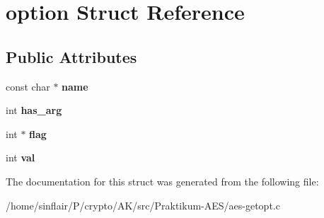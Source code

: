 \hypertarget{structoption}{}\section{option Struct Reference}
\label{structoption}
\subsection*{Public Attributes}
\begin{DoxyCompactItemize}
\item 
\mbox{\label{structoption_adc503659d37af8017fb4b86d61c99086}} 
const char $\ast$ {\bfseries name}
\item 
\mbox{\label{structoption_a90d7ee9a51eea5c002682dbd0af149e4}} 
int {\bfseries has\+\_\+arg}
\item 
\mbox{\label{structoption_ab366eea5fe7be25c1928328ba715e353}} 
int $\ast$ {\bfseries flag}
\item 
\mbox{\label{structoption_a13bd155ec3b405d29c41ab8d0793be11}} 
int {\bfseries val}
\end{DoxyCompactItemize}


The documentation for this struct was generated from the following file\+:\begin{DoxyCompactItemize}
\item 
/home/sinflair/\+P/crypto/\+A\+K/src/\+Praktikum-\/\+A\+E\+S/aes-\/getopt.\+c\end{DoxyCompactItemize}
